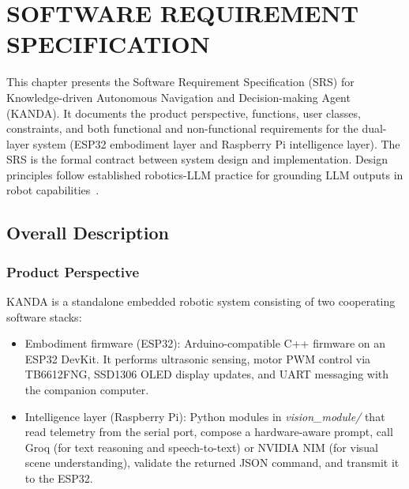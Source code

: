 \chapter{SOFTWARE REQUIREMENT SPECIFICATION}
\label{ch:srs}

This chapter presents the Software Requirement Specification (SRS) for Knowledge-driven Autonomous Navigation and Decision-making Agent (KANDA). It documents the product perspective, functions, user classes, constraints, and both functional and non-functional requirements for the dual-layer system (ESP32 embodiment layer and Raspberry Pi intelligence layer). The SRS is the formal contract between system design and implementation. Design principles follow established robotics-LLM practice for grounding LLM outputs in robot capabilities~\cite{vemprala2024chatgpt,ahn2022saycan}.

\section{Overall Description}
\label{sec:overall}

\subsection{Product Perspective}
\label{subsec:perspective}

KANDA is a standalone embedded robotic system consisting of two cooperating software stacks:

\begin{itemize}[nosep]
  \item Embodiment firmware (ESP32): Arduino-compatible C++ firmware on an ESP32 DevKit. It performs ultrasonic sensing, motor PWM control via TB6612FNG, SSD1306 OLED display updates, and UART messaging with the companion computer.

  \item Intelligence layer (Raspberry Pi): Python modules in \textit{vision\_module/} that read telemetry from the serial port, compose a hardware-aware prompt, call Groq (for text reasoning and speech-to-text) or NVIDIA NIM (for visual scene understanding), validate the returned JSON command, and transmit it to the ESP32.

\end{itemize}

